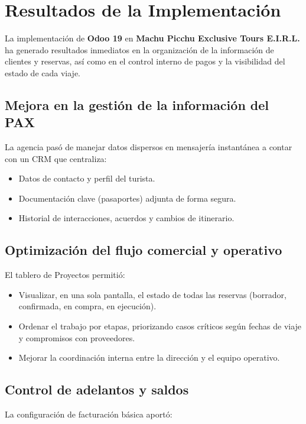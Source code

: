 \section{Resultados de la Implementación}

La implementación de \textbf{Odoo 19} en \textbf{Machu Picchu Exclusive Tours E.I.R.L.} ha generado resultados inmediatos en la organización de la información de clientes y reservas, así como en el control interno de pagos y la visibilidad del estado de cada viaje.

\subsection{Mejora en la gestión de la información del PAX}

La agencia pasó de manejar datos dispersos en mensajería instantánea a contar con un CRM que centraliza:

\begin{itemize}
    \item Datos de contacto y perfil del turista.
    \item Documentación clave (pasaportes) adjunta de forma segura.
    \item Historial de interacciones, acuerdos y cambios de itinerario.
\end{itemize}

\subsection{Optimización del flujo comercial y operativo}

El tablero de Proyectos permitió:

\begin{itemize}
    \item Visualizar, en una sola pantalla, el estado de todas las reservas (borrador, confirmada, en compra, en ejecución).
    \item Ordenar el trabajo por etapas, priorizando casos críticos según fechas de viaje y compromisos con proveedores.
    \item Mejorar la coordinación interna entre la dirección y el equipo operativo.
\end{itemize}

\subsection{Control de adelantos y saldos}

La configuración de facturación básica aportó:

